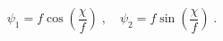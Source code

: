 \begin{equation}
\psi_1 = f \cos \left(\frac{\chi}{f}\right) \; , \quad
\psi_2 = f \sin \left(\frac{\chi}{f}\right) \; .
\end{equation}

